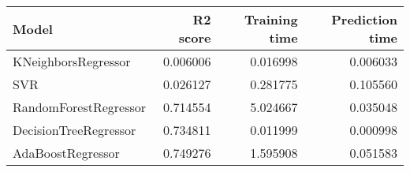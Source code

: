 \begin{tabular}{lrrr}
\toprule
Model & R2 score & Training time & Prediction time \\
\midrule
KNeighborsRegressor & 0.006006 & 0.016998 & 0.006033 \\
SVR & 0.026127 & 0.281775 & 0.105560 \\
RandomForestRegressor & 0.714554 & 5.024667 & 0.035048 \\
DecisionTreeRegressor & 0.734811 & 0.011999 & 0.000998 \\
AdaBoostRegressor & 0.749276 & 1.595908 & 0.051583 \\
\bottomrule
\end{tabular}
